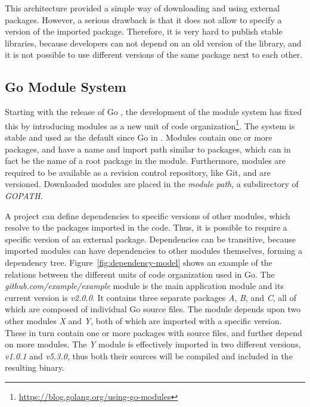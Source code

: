 This architecture provided a simple way of downloading and using external packages.
However, a serious drawback is that it does not allow to specify a version of the imported package.
Therefore, it is very hard to publish stable libraries, because developers can not depend on an old version of the
library, and it is not possible to use different versions of the same package next to each other.



\subsection{Go Module System}\label{subsec:background:dependencies:modules}

Starting with the release of Go , the development of the module system has fixed this by introducing
modules as a new unit of code organization\footnote{\url{https://blog.golang.org/using-go-modules}}.
The system is stable and used as the default since Go  in .
Modules contain one or more packages, and have a name and import path similar to packages, which can in fact be the name
of a root package in the module.
Furthermore, modules are required to be available as a revision control repository, like Git, and are versioned.
Downloaded modules are placed in the \textit{module path}, a subdirectory of \textit{GOPATH}.

A project can define dependencies to specific versions of other modules, which resolve to the packages imported in the
code.
Thus, it is possible to require a specific version of an external package.
Dependencies can be transitive, because imported modules can have dependencies to other modules themselves,
forming a dependency tree.
Figure~\ref{fig:dependency-model} shows an example of the relations between the different units of code organization
used in Go.
The \textit{github.com/example/example} module is the main application module and its current version is
\textit{v2.0.0}.
It contains three separate packages \textit{A}, \textit{B}, and \textit{C}, all of which are composed of individual Go
source files.
The module depends upon two other modules \textit{X} and \textit{Y}, both of which are imported with a specific version.
These in turn contain one or more packages with source files, and further depend on more modules.
The \textit{Y} module is effectively imported in two different versions, \textit{v1.0.1} and \textit{v5.3.0}, thus both
their sources will be compiled and included in the resulting binary.

